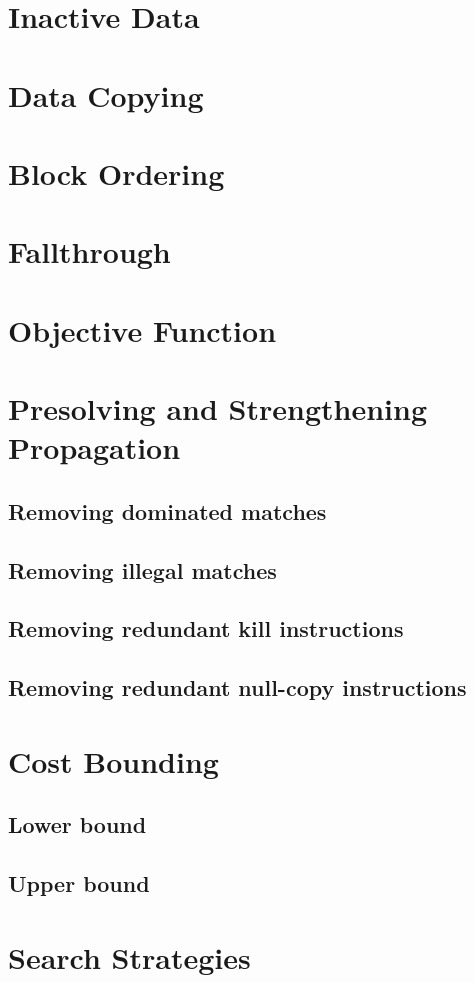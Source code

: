 \documentclass{book}
\begin{document}
\section{Inactive Data}
\section{Data Copying}
\section{Block Ordering}
\section{Fallthrough}
\section{Objective Function}
\section{Presolving and Strengthening Propagation}
\subsection{Removing dominated matches}
\subsection{Removing illegal matches}
\subsection{Removing redundant kill instructions}
\subsection{Removing redundant null-copy instructions}
\section{Cost Bounding}
\subsection{Lower bound}
\subsection{Upper bound}
\section{Search Strategies}
\end{document}

